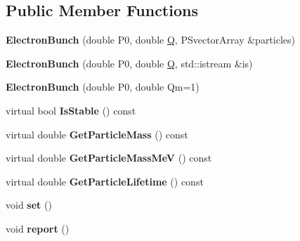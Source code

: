 \subsection*{Public Member Functions}
\begin{DoxyCompactItemize}
\item 
\mbox{\label{classParticleTracking_1_1ElectronBunch_a3ece7133ea022eadf059234b38318b63}} 
{\bfseries Electron\+Bunch} (double P0, double \hyperlink{namespaceParticleTracking_a3e89510a540596b235a808915deb0f7a}{Q}, P\+Svector\+Array \&particles)
\item 
\mbox{\label{classParticleTracking_1_1ElectronBunch_a614833e3c43033b193c361cfa0c67c9b}} 
{\bfseries Electron\+Bunch} (double P0, double \hyperlink{namespaceParticleTracking_a3e89510a540596b235a808915deb0f7a}{Q}, std\+::istream \&is)
\item 
\mbox{\label{classParticleTracking_1_1ElectronBunch_acba0ccc138b89bd959cccb553917e975}} 
{\bfseries Electron\+Bunch} (double P0, double Qm=1)
\item 
\mbox{\label{classParticleTracking_1_1ElectronBunch_ade1b916df46d59543b8023e94bff1b01}} 
virtual bool {\bfseries Is\+Stable} () const
\item 
\mbox{\label{classParticleTracking_1_1ElectronBunch_a2dcf33728949051ac3a3213636bbadbc}} 
virtual double {\bfseries Get\+Particle\+Mass} () const
\item 
\mbox{\label{classParticleTracking_1_1ElectronBunch_aa2fb3184a2f3a43b15c718ca1b6c76a3}} 
virtual double {\bfseries Get\+Particle\+Mass\+MeV} () const
\item 
\mbox{\label{classParticleTracking_1_1ElectronBunch_a28065187be47dd9c62cfa9711897d6d7}} 
virtual double {\bfseries Get\+Particle\+Lifetime} () const
\item 
\mbox{\label{classParticleTracking_1_1ElectronBunch_aa7a7b711f90f558030b9c69949ab668e}} 
void {\bfseries set} ()
\item 
\mbox{\label{classParticleTracking_1_1ElectronBunch_aa253bb32fb5041946c43002ae4e9d736}} 
void {\bfseries report} ()
\end{DoxyCompactItemize}
